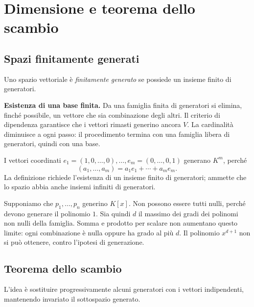 
\section{Dimensione e teorema dello scambio}

\subsection{Spazi finitamente generati}

\begin{definizione}
Uno spazio vettoriale è \emph{finitamente generato} se possiede un insieme finito di generatori.
\end{definizione}

\textbf{Esistenza di una base finita.} Da una famiglia finita di generatori si elimina, finché possibile, un vettore che sia combinazione degli altri. Il criterio di dipendenza garantisce che i vettori rimasti generino ancora $V$. La cardinalità diminuisce a ogni passo: il procedimento termina con una famiglia libera di generatori, quindi con una base.

\begin{esempio}
I vettori coordinati $e_1=(1,0,\ldots,0),\ldots,e_m=(0,\ldots,0,1)$ generano $K^m$, perché
\[
  (a_1,\ldots,a_m)=a_1e_1+\cdots+a_me_m.
\]
La definizione richiede l'esistenza di un insieme finito di generatori; ammette che lo spazio abbia anche insiemi infiniti di generatori.
\end{esempio}

\begin{esempio}
Supponiamo che $p_1,\ldots,p_n$ generino $K[x]$. Non possono essere tutti nulli, perché devono generare il polinomio $1$. Sia quindi $d$ il massimo dei gradi dei polinomi non nulli della famiglia. Somma e prodotto per scalare non aumentano questo limite: ogni combinazione è nulla oppure ha grado al più $d$. Il polinomio $x^{d+1}$ non si può ottenere, contro l'ipotesi di generazione.
\end{esempio}

\subsection{Teorema dello scambio}

L'idea è sostituire progressivamente alcuni generatori con i vettori indipendenti, mantenendo invariato il sottospazio generato.


